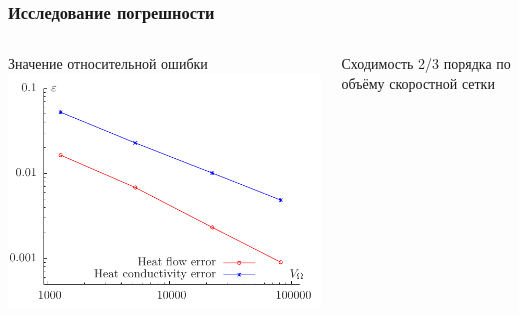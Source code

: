\documentclass[ucs]{beamer}
\begin{document}
\begin{frame}
	\frametitle{Исследование погрешности}
	\begin{columns}
		\begin{center}
			Значение относительной ошибки\\
			\includegraphics[width=\textwidth]{pics/error}
		\end{center}
		\begin{center}
			Сходимость \alert{2/3} порядка по \alert{объёму} скоростной сетки
		\end{center}
	\end{columns}
\end{frame}
\end{document}
